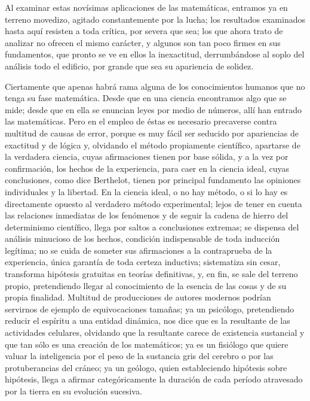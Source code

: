 \documentclass[a4paper, 12pt]{article}
\begin{document}
Al examinar estas novísimas aplicaciones de las matemáticas, entramos ya en terreno movedizo, agitado constantemente por la lucha; los resultados examinados hasta aquí resisten a toda crítica, por severa que sea; los que ahora trato de analizar no ofrecen el mismo carácter, y algunos son tan poco firmes en sus fundamentos, que pronto se ve en ellos la inexactitud, derrumbándose al soplo del análisis todo el edificio, por grande que sea su apariencia de solidez.




Ciertamente que apenas habrá rama alguna de los conocimientos humanos que no tenga su fase matemática. Desde que en una ciencia encontramos algo que se mide; desde que en ella se enuncian leyes por medio de números, allí han entrado las matemáticas. Pero en el empleo de éstas es necesario precaverse contra multitud de causas de error, porque es muy fácil ser seducido por apariencias de exactitud y de lógica y, olvidando el método propiamente científico, apartarse de la verdadera ciencia, cuyas afirmaciones tienen por base sólida, y a la vez por confirmación, los hechos de la experiencia, para caer en la ciencia ideal, cuyas conclusiones, como dice Berthelot, tienen por principal fundamento las opiniones individuales y la libertad. En la ciencia ideal, o no hay método, o si lo hay es directamente opuesto al verdadero método experimental; lejos de tener en cuenta las relaciones inmediatas de los fenómenos y de seguir la cadena de hierro del determinismo científico, llega por saltos a conclusiones extremas; se dispensa del análisis minucioso de los hechos, condición indispensable de toda inducción legítima; no se cuida de someter sus afirmaciones a la contraprueba de la experiencia, única garantía de toda certeza inductiva; sistematiza sin cesar, transforma hipótesis gratuitas en teorías definitivas, y, en fin, se sale del terreno propio, pretendiendo llegar al conocimiento de la esencia de las cosas y de su propia finalidad. Multitud de producciones de autores modernos podrían servirnos de ejemplo de equivocaciones tamañas; ya un psicólogo, pretendiendo reducir el espíritu a una entidad dinámica, nos dice que es la resultante de las actividades celulares, olvidando que la resultante carece de existencia sustancial y que tan sólo es una creación de los matemáticos; ya es un fisiólogo que quiere valuar la inteligencia por el peso de la sustancia gris del cerebro o por las protuberancias del cráneo; ya un geólogo, quien estableciendo hipótesis sobre hipótesis, llega a afirmar categóricamente la duración de cada período atravesado por la tierra en su evolución sucesiva.
\end{document}

